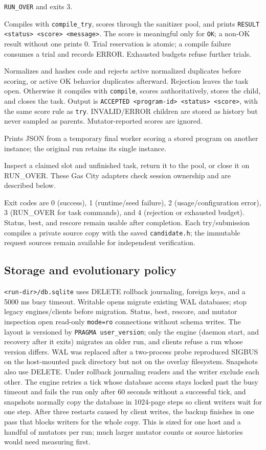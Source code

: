 \documentclass[11pt]{article}
\newcommand{\code}[1]{\texttt{#1}}
\begin{document}
\begin{description}
\code{RUN\_OVER} and exits 3.
\item[try] Compiles with \code{compile\_try}, scores through the sanitizer pool,
and prints \code{RESULT <status> <score> <message>}. The score is meaningful
only for \code{OK}; a non-OK result without one prints 0. Trial reservation is atomic;
a compile failure consumes a trial and records ERROR. Exhausted budgets refuse
further trials.
\item[submit] Normalizes and hashes code and rejects active normalized duplicates
before scoring, or active OK behavior duplicates afterward. Rejection leaves
the task open. Otherwise it compiles with \code{compile}, scores authoritatively,
stores the child, and closes the task. Output is
\code{ACCEPTED <program-id> <status> <score>}, with the same score rule as
\code{try}. INVALID/ERROR children are stored
as history but never sampled as parents. Mutator-reported scores are ignored.
\item[rescore] Prints JSON from a temporary final worker scoring a stored program
on another instance; the original run retains its single instance.
\item[slot show / release / close] Inspect a claimed slot and unfinished task,
return it to the pool, or close it on RUN\_OVER. These Gas City adapters check
session ownership and are described below.
\end{description}
Exit codes are 0 (success), 1 (runtime/seed failure), 2 (usage/configuration
error), 3 (RUN\_OVER for task commands), and 4 (rejection or exhausted budget).
Status, best, and rescore remain usable after completion. Each try/submission
compiles a private source copy with the saved \code{candidate.h}; the immutable
request sources remain available for independent verification.

\subsection{Storage and evolutionary policy}
\code{<run-dir>/db.sqlite} uses DELETE rollback journaling, foreign keys, and a
5000 ms busy timeout. Writable opens migrate existing WAL databases; stop legacy
engines/clients before migration. Status, best, rescore, and mutator inspection
open read-only \code{mode=ro} connections without schema writes. The layout is
versioned by \code{PRAGMA user\_version}; only the engine (daemon start, and
recovery after it exits) migrates an older run, and clients refuse a run whose
version differs. WAL was replaced
after a two-process probe reproduced SIGBUS on the host-mounted pack directory
but not on the overlay filesystem. Snapshots also use DELETE.
Under rollback journaling readers and the writer exclude each other. The
engine retries a tick whose database access stays locked past the busy timeout
and fails the run only after 60 seconds without a successful tick, and
snapshots normally copy the database in 1024-page steps so client writers wait
for one step. After three restarts caused by client writes, the backup finishes
in one pass that blocks writers for the whole copy. This is sized for one host
and a handful of mutators per run; much larger mutator counts or source histories
would need measuring first.
\end{document}
